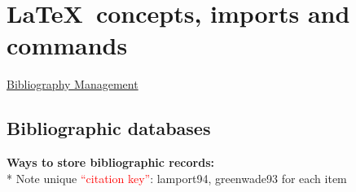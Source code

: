 \documentclass[a4paper,11pt]{article}
\begin{document}
\section{\LaTeX~concepts, imports and commands}

\href{https://en.wikibooks.org/wiki/LaTeX/Bibliography_Management}{Bibliography Management}

\subsection{Bibliographic databases}
	
\textbf{Ways to store bibliographic records:}\\

* Note unique \textcolor{red}{``citation key''}: lamport94, greenwade93 for each item 
\end{document}
